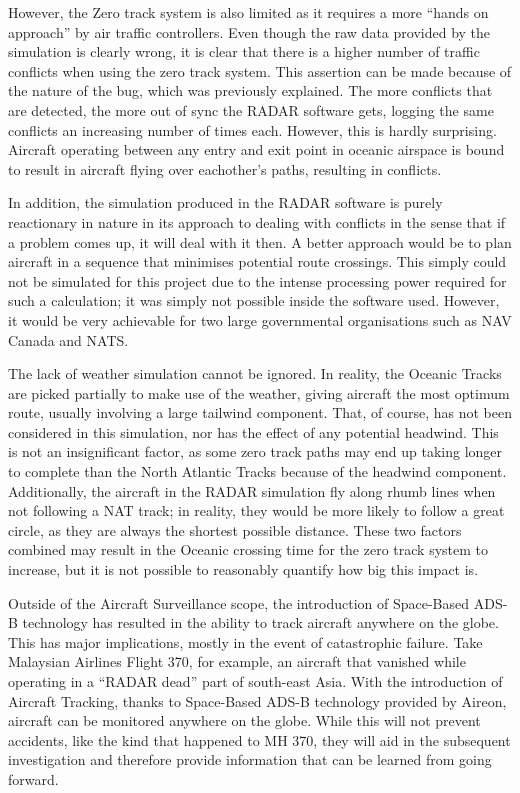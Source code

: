 \documentclass[stu, a4paper, 12pt, floatsintext]{apa7}
\numberwithin{figure}{section}
\numberwithin{table}{section}
\numberwithin{equation}{section}
\begin{document}
However, the Zero track system is also limited as it requires a more “hands on approach” by air traffic controllers. Even though the raw data provided by the simulation is clearly wrong, it is clear that there is a higher number of traffic conflicts when using the zero track system. This assertion can be made because of the nature of the bug, which was previously explained. The more conflicts that are detected, the more out of sync the RADAR software gets, logging the same conflicts an increasing number of times each. However, this is hardly surprising. Aircraft operating between any entry and exit point in oceanic airspace is bound to result in aircraft flying over eachother’s paths, resulting in conflicts. 

In addition, the simulation produced in the RADAR software is purely reactionary in nature in its approach to dealing with conflicts in the sense that if a problem comes up, it will deal with it then. A better approach would be to plan aircraft in a sequence that minimises potential route crossings. This simply could not be simulated for this project due to the intense processing power required for such a calculation; it was simply not possible inside the software used. However, it would be very achievable for two large governmental organisations such as NAV Canada and NATS. 

The lack of weather simulation cannot be ignored. In reality, the Oceanic Tracks are picked partially to make use of the weather, giving aircraft the most optimum route, usually involving a large tailwind component. That, of course, has not been considered in this simulation, nor has the effect of any potential headwind. This is not an insignificant factor, as some zero track paths may end up taking longer to complete than the North Atlantic Tracks because of the headwind component. Additionally, the aircraft in the RADAR simulation fly along rhumb lines when not following a NAT track; in reality, they would be more likely to follow a great circle, as they are always the shortest possible distance. These two factors combined may result in the Oceanic crossing time for the zero track system to increase, but it is not possible to reasonably quantify how big this impact is. 

Outside of the Aircraft Surveillance scope, the introduction of Space-Based ADS-B technology has resulted in the ability to track aircraft anywhere on the globe. This has major implications, mostly in the event of catastrophic failure. Take Malaysian Airlines Flight 370, for example, an aircraft that vanished while operating in a “RADAR dead” part of south-east Asia. With the introduction of Aircraft Tracking, thanks to Space-Based ADS-B technology provided by Aireon, aircraft can be monitored anywhere on the globe. While this will not prevent accidents, like the kind that happened to MH 370, they will aid in the subsequent investigation and therefore provide information that can be learned from going forward.
\end{document}
